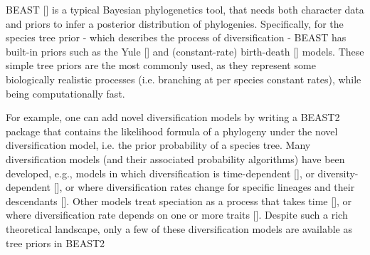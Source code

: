 BEAST [\cite{drummond2007beast}] is a typical Bayesian phylogenetics tool, 
that needs both character data and priors to infer 
a posterior distribution of phylogenies.
Specifically, for the species tree prior - which describes 
the process of diversification - 
BEAST has built-in priors such as the Yule [\cite{yule}] and 
(constant-rate) birth-death [\cite{nee1994reconstructed}] models.
These simple tree priors are  the most commonly used, 
as they represent some biologically realistic processes (i.e. 
branching at per species constant rates), while being computationally fast.



For example, one can add novel diversification models 
by writing a BEAST2 package that contains the likelihood 
formula of a phylogeny under the novel diversification model, 
i.e. the prior probability of a species tree.
Many diversification models (and their associated probability algorithms) 
have been developed, e.g., models in which diversification is time-dependent [\cite{nee1994reconstructed,rabosky2008explosive}],
or diversity-dependent [\cite{etienne2012diversity}],
or where diversification rates change for specific lineages 
and their descendants [\cite{etienne2012conceptual, rabosky2014automatic, alfaro2009nine}].
Other models treat speciation as a process that takes 
time [\cite{rosindell2010protracted, etienne2012prolonging, lambert2015reconstructed}],
or where diversification rate
depends on one or more traits [\cite{maddison2007estimating, fitzjohn2012diversitree}].
Despite such a rich theoretical landscape, only a few of these 
diversification models are available as tree priors in BEAST2


